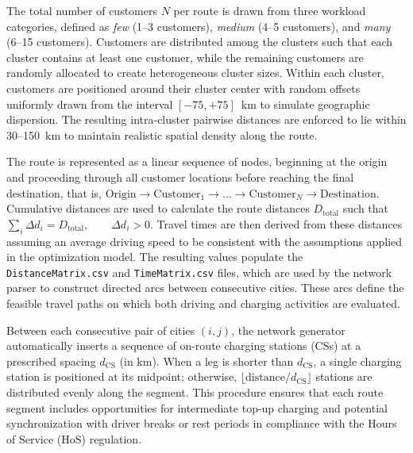 \documentclass[trsc,dblanonrev]{informs4}
\begin{document}
The total number of customers $N$ per route is drawn from three workload categories, defined as \emph{few} (1–3 customers), \emph{medium} (4–5 customers), and \emph{many} (6–15 customers). Customers are distributed among the clusters such that each cluster contains at least one customer, while the remaining customers are randomly allocated to create heterogeneous cluster sizes. Within each cluster, customers are positioned around their cluster center with random offsets uniformly drawn from the interval $[-75, +75]$~km to simulate geographic dispersion. The resulting intra-cluster pairwise distances are enforced to lie within 30–150~km to maintain realistic spatial density along the route.

The route is represented as a linear sequence of nodes, beginning at the origin and proceeding through all customer locations before reaching the final destination, that is,
\(
\text{Origin} \rightarrow \text{Customer}_1 \rightarrow \dots \rightarrow \text{Customer}_N \rightarrow \text{Destination}.
\)
Cumulative distances are used to calculate the route distances $D_{\text{total}}$ such that
\(
\sum_i \Delta d_i = D_{\text{total}}, \qquad \Delta d_i > 0.
\)
Travel times are then derived from these distances assuming an average driving speed to be consistent with the assumptions applied in the optimization model. The resulting values populate the \texttt{DistanceMatrix.csv} and \texttt{TimeMatrix.csv} files, which are used by the network parser to construct directed arcs between consecutive cities. These arcs define the feasible travel paths on which both driving and charging activities are evaluated.

Between each consecutive pair of cities $(i,j)$, the network generator automatically inserts a sequence of on-route charging stations (CSs) at a prescribed spacing $d_{\text{CS}}$ (in km). When a leg is shorter than $d_{\text{CS}}$, a single charging station is positioned at its midpoint; otherwise, $\lfloor \text{distance}/d_{\text{CS}} \rfloor$ stations are distributed evenly along the segment. This procedure ensures that each route segment includes opportunities for intermediate top-up charging and potential synchronization with driver breaks or rest periods in compliance with the Hours of Service (HoS) regulation.
\end{document}
